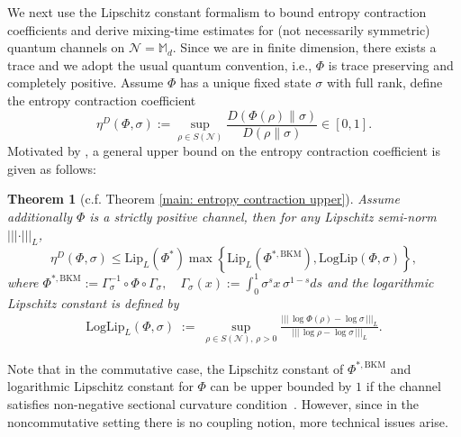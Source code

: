 \documentclass[11pt,reqno]{amsart}
\numberwithin{equation}{section}
\newtheorem{theorem}[lemma]{Theorem}
\newcommand{\mb}{\mathbb}
\newcommand{\mc}{\mathcal}
\newcommand{\Lip}{\mathrm{Lip}}
\begin{document}
We next use the Lipschitz constant formalism to bound entropy contraction coefficients and derive mixing-time estimates for (not necessarily symmetric) quantum channels on $\mc N = \mb M_d$. Since we are in finite dimension, there exists a trace and we adopt the usual quantum convention, i.e., $\Phi$ is trace preserving and completely positive. Assume $\Phi$ has a unique fixed state $\sigma$ with full rank, define the entropy contraction coefficient
\begin{equation}
    \eta^D(\Phi,\sigma):= \sup_{\rho \in S(\mc N)} \frac{D(\Phi(\rho) \| \sigma)}{D(\rho \| \sigma)} \in [0,1].
\end{equation}
Motivated by \cite{caputo2025entropy}, a general upper bound on the entropy contraction coefficient is given as follows:
\begin{theorem}[c.f. Theorem \ref{main: entropy contraction upper}] \label{thm:entropy-contraction}
  Assume additionally $\Phi$ is a strictly positive channel, then for any Lipschitz semi-norm $|||\cdot|||_{L}$,
  \[
    \eta^{D}(\Phi,\sigma) \le \Lip_L(\Phi^*)
    \max\left \{
      \Lip_L(\Phi^{\mathrm{*,BKM}}),\mathrm{LogLip}(\Phi,\sigma)
    \right\},
  \]
  where $ \Phi^{\mathrm{*,BKM}}:=  \Gamma_\sigma^{-1} \circ \Phi \circ \Gamma_\sigma,\quad \Gamma_\sigma(x):= \int_0^1 \sigma^s x\, \sigma^{1-s}ds$ and the logarithmic Lipschitz constant is defined by 
  \begin{align*}
       \mathrm{LogLip}_L(\Phi,\sigma)
    \;:=\;
    \sup_{\rho\in S(\mathcal N),\,\rho>0}
      \frac{|||\,\log\Phi(\rho)-\log\sigma\,|||_{L}}
           {|||\,\log\rho-\log\sigma\,|||_{L}}.
  \end{align*}
\end{theorem}
Note that in the commutative case, the Lipschitz constant of $\Phi^{\mathrm{*,BKM}}$ and logarithmic Lipschitz constant for $\Phi$ can be upper bounded by $1$ if the channel satisfies non-negative sectional curvature condition~\cite{caputo2025entropy}. However, since in the noncommutative setting there is no coupling notion, more technical issues arise.
\end{document}
